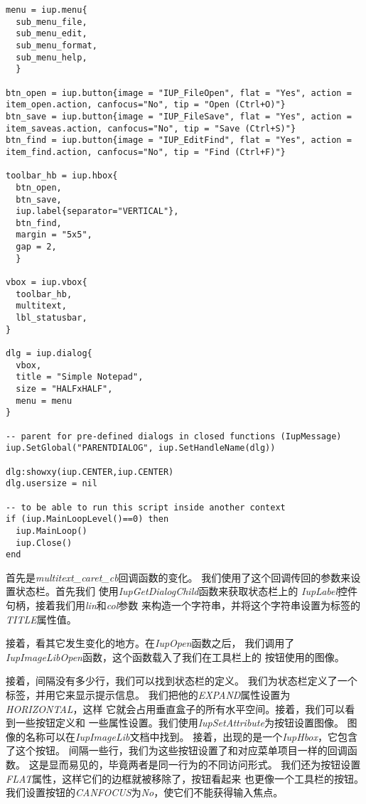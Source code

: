 \documentclass{ctexart}
\begin{document}
\begin{lstlisting}
menu = iup.menu{
  sub_menu_file, 
  sub_menu_edit, 
  sub_menu_format, 
  sub_menu_help,
  }

btn_open = iup.button{image = "IUP_FileOpen", flat = "Yes", action = item_open.action, canfocus="No", tip = "Open (Ctrl+O)"}
btn_save = iup.button{image = "IUP_FileSave", flat = "Yes", action = item_saveas.action, canfocus="No", tip = "Save (Ctrl+S)"}
btn_find = iup.button{image = "IUP_EditFind", flat = "Yes", action = item_find.action, canfocus="No", tip = "Find (Ctrl+F)"}

toolbar_hb = iup.hbox{
  btn_open,
  btn_save,
  iup.label{separator="VERTICAL"},
  btn_find,
  margin = "5x5",
  gap = 2,
  }

vbox = iup.vbox{
  toolbar_hb,
  multitext,
  lbl_statusbar,
}

dlg = iup.dialog{
  vbox,
  title = "Simple Notepad",
  size = "HALFxHALF",
  menu = menu
}

-- parent for pre-defined dialogs in closed functions (IupMessage)
iup.SetGlobal("PARENTDIALOG", iup.SetHandleName(dlg))

dlg:showxy(iup.CENTER,iup.CENTER)
dlg.usersize = nil

-- to be able to run this script inside another context
if (iup.MainLoopLevel()==0) then
  iup.MainLoop()
  iup.Close()
end
\end{lstlisting}

首先是\emph{multitext\_caret\_cb}回调函数的变化。
我们使用了这个回调传回的参数来设置状态栏。首先我们
使用\emph{IupGetDialogChild}函数来获取状态栏上的
\emph{IupLabel}控件句柄，接着我们用\emph{lin}和\emph{col}参数
来构造一个字符串，并将这个字符串设置为标签的\emph{TITLE}属性值。

接着，看其它发生变化的地方。在\emph{IupOpen}函数之后，
我们调用了\emph{IupImageLibOpen}函数，这个函数载入了我们在工具栏上的
按钮使用的图像。

接着，间隔没有多少行，我们可以找到状态栏的定义。
我们为状态栏定义了一个标签，并用它来显示提示信息。
我们把他的\emph{EXPAND}属性设置为\emph{HORIZONTAL}，这样
它就会占用垂直盒子的所有水平空间。接着，我们可以看到一些按钮定义和
一些属性设置。我们使用\emph{IupSetAttribute}为按钮设置图像。
图像的名称可以在\emph{IupImageLib}文档中找到。
接着，出现的是一个\emph{IupHbox}，它包含了这个按钮。
间隔一些行，我们为这些按钮设置了和对应菜单项目一样的回调函数。
这是显而易见的，毕竟两者是同一行为的不同访问形式。
我们还为按钮设置\emph{FLAT}属性，这样它们的边框就被移除了，按钮看起来
也更像一个工具栏的按钮。
我们设置按钮的\emph{CANFOCUS}为\emph{No}，使它们不能获得输入焦点。
\end{document}
